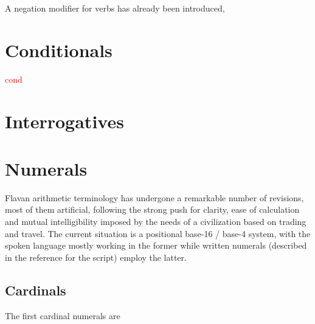 \documentclass[10pt,oneside]{memoir}
\newcommand{\cmmnt}[1]{\textcolor{red}{#1}}
\begin{document}
A negation modifier for verbs has already been introduced, 

\pagebreak

\section{Conditionals}
\cmmnt{cond}

\pagebreak

\section{Interrogatives}

\section{Numerals}

Flavan arithmetic terminology has undergone a remarkable number of revisions, most of them artificial, following the strong push for clarity, ease of calculation and mutual intelligibility imposed by the needs of a civilization based on trading and travel. The current situation is a positional base-16 / base-4 system, with the spoken language mostly working in the former while written numerals (described in the reference for the script) employ the latter.

\subsection{Cardinals}

The first cardinal numerals are
\end{document}
